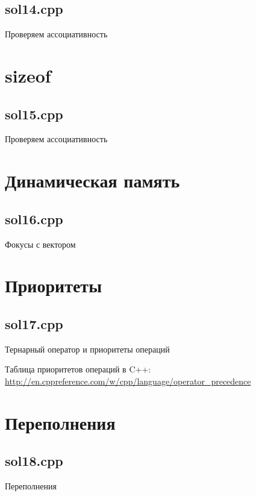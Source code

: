 \documentclass[mathserif,utf8,xcolor=table,11pt]{beamer}
\begin{document}
\subsection{sol14.cpp}
\begin{frame}[t]{Проверяем ассоциативность}
  
%  
\end{frame}

\section{sizeof}
\subsection{sol15.cpp}
\begin{frame}[t]{Проверяем ассоциативность}
  
  
\end{frame}

\section{Динамическая память}
\subsection{sol16.cpp}
\begin{frame}[t]{Фокусы с вектором}
  
\end{frame}

\section{Приоритеты}
\subsection{sol17.cpp}
\begin{frame}[t]{Тернарный оператор и приоритеты операций}
  
  

Таблица приоритетов операций в C++:
\url{http://en.cppreference.com/w/cpp/language/operator_precedence}
\end{frame}

\section{Переполнения}
\subsection{sol18.cpp}
\begin{frame}[t]{Переполнения}
  
\end{frame}
\end{document}
